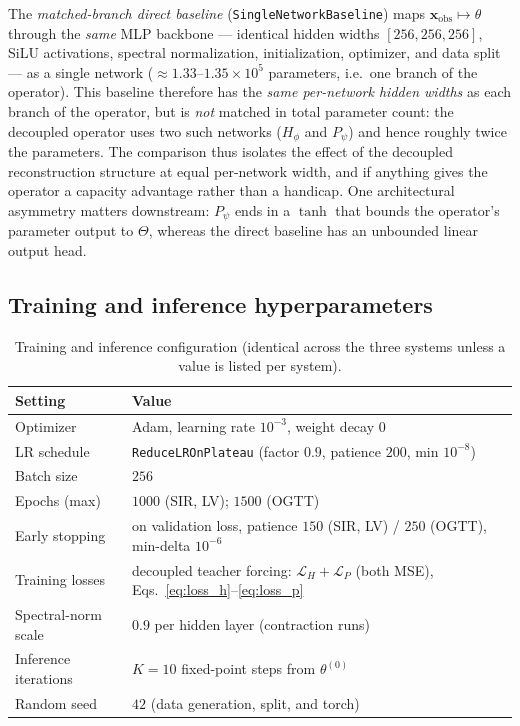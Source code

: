 The \emph{matched-branch direct baseline} (\texttt{SingleNetworkBaseline}) maps $\mathbf{x}_\mathrm{obs}
\mapsto\theta$ through the \emph{same} MLP backbone --- identical hidden widths $[256,256,256]$, SiLU
activations, spectral normalization, initialization, optimizer, and data split --- as a single network
($\approx1.33$--$1.35\times10^5$ parameters, i.e.\ one branch of the operator). This baseline therefore has
the \emph{same per-network hidden widths} as each branch of the operator, but is \emph{not} matched in total
parameter count: the decoupled operator uses two such networks ($H_\phi$ and $P_\psi$) and hence roughly twice
the parameters. The comparison thus isolates the effect of the decoupled reconstruction structure at equal
per-network width, and if anything gives the operator a capacity advantage rather than a handicap. One
architectural asymmetry matters downstream: $P_\psi$ ends in a $\tanh$ that bounds the operator's parameter
output to $\Theta$, whereas the direct baseline has an unbounded linear output head.

\subsection{Training and inference hyperparameters}
\label{app:repro-train}

\begin{table}[h]
\centering
\caption{Training and inference configuration (identical across the three systems unless a value is
listed per system).}
\label{tab:hyperparams}
{\small
\begin{tabular}{ll}
\hline
Setting & Value \\
\hline
Optimizer & Adam, learning rate $10^{-3}$, weight decay $0$ \\
LR schedule & \texttt{ReduceLROnPlateau} (factor $0.9$, patience $200$, min $10^{-8}$) \\
Batch size & $256$ \\
Epochs (max) & $1000$ (SIR, LV); $1500$ (OGTT) \\
Early stopping & on validation loss, patience $150$ (SIR, LV) / $250$ (OGTT), min-delta $10^{-6}$ \\
Training losses & decoupled teacher forcing: $\mathcal{L}_H+\mathcal{L}_P$ (both MSE), Eqs.~\eqref{eq:loss_h}--\eqref{eq:loss_p} \\
Spectral-norm scale & $0.9$ per hidden layer (contraction runs) \\
Inference iterations & $K=10$ fixed-point steps from $\theta^{(0)}$ \\
Random seed & $42$ (data generation, split, and torch) \\
\hline
\end{tabular}
}
\end{table}

